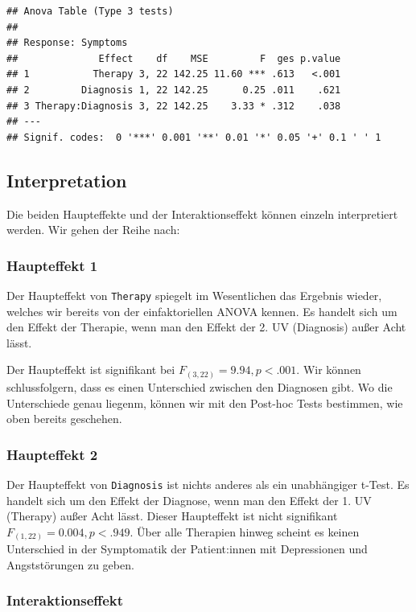 \documentclass[
]{book}
\begin{document}
\begin{verbatim}
## Anova Table (Type 3 tests)
## 
## Response: Symptoms
##              Effect    df    MSE         F  ges p.value
## 1           Therapy 3, 22 142.25 11.60 *** .613   <.001
## 2         Diagnosis 1, 22 142.25      0.25 .011    .621
## 3 Therapy:Diagnosis 3, 22 142.25    3.33 * .312    .038
## ---
## Signif. codes:  0 '***' 0.001 '**' 0.01 '*' 0.05 '+' 0.1 ' ' 1
\end{verbatim}

\hypertarget{interpretation-1}{%
\subsection{Interpretation}\label{interpretation-1}}

Die beiden Haupteffekte und der Interaktionseffekt können einzeln interpretiert werden. Wir gehen der Reihe nach:

\hypertarget{haupteffekt-1}{%
\subsubsection{Haupteffekt 1}\label{haupteffekt-1}}

Der Haupteffekt von \texttt{Therapy} spiegelt im Wesentlichen das Ergebnis wieder, welches wir bereits von der einfaktoriellen ANOVA kennen. Es handelt sich um den Effekt der Therapie, wenn man den Effekt der 2. UV (Diagnosis) außer Acht lässt.

Der Haupteffekt ist signifikant bei \(F_{(3,22)}=9.94, p<.001\). Wir können schlussfolgern, dass es einen Unterschied zwischen den Diagnosen gibt. Wo die Unterschiede genau liegenm, können wir mit den Post-hoc Tests bestimmen, wie oben bereits geschehen.

\hypertarget{haupteffekt-2}{%
\subsubsection{Haupteffekt 2}\label{haupteffekt-2}}

Der Haupteffekt von \texttt{Diagnosis} ist nichts anderes als ein unabhängiger t-Test. Es handelt sich um den Effekt der Diagnose, wenn man den Effekt der 1. UV (Therapy) außer Acht lässt. Dieser Haupteffekt ist nicht signifikant \(F_{(1,22)}=0.004, p<.949\). Über alle Therapien hinweg scheint es keinen Unterschied in der Symptomatik der Patient:innen mit Depressionen und Angststörungen zu geben.

\hypertarget{interaktionseffekt}{%
\subsubsection{Interaktionseffekt}\label{interaktionseffekt}}
\end{document}

